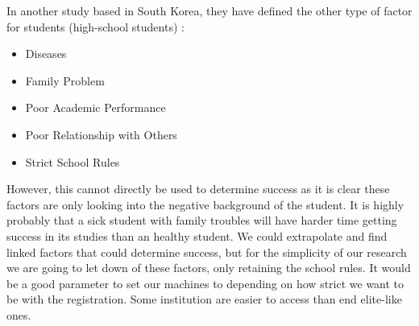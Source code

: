\documentclass[../../main.tex]{subfiles}
\begin{document}
In another study based in South Korea, they have defined the other type of factor for students (high-school students) \cite{lee_machine_2019} :
\begin{itemize}
    \item Diseases
    \item Family Problem
    \item Poor Academic Performance
    \item Poor Relationship with Others
    \item Strict School Rules
\end{itemize}
However, this cannot directly be used to determine success as it is clear these factors are only looking into the negative background of the student. It is highly probably that a sick student with family troubles will have harder time getting success in its studies than an healthy student. We could extrapolate and find linked factors that could determine success, but for the simplicity of our research we are going to let down of these factors, only retaining the school rules. It would be a good parameter to set our machines to depending on how strict we want to be with the registration. Some institution are easier to access than end elite-like ones.
\end{document}
